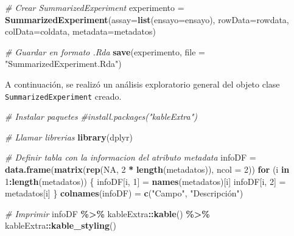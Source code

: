 \documentclass[
]{article}
\newenvironment{Shaded}{\begin{snugshade}}{\end{snugshade}}
\newcommand{\AttributeTok}[1]{\textcolor[rgb]{0.13,0.29,0.53}{#1}}
\newcommand{\CommentTok}[1]{\textcolor[rgb]{0.56,0.35,0.01}{\textit{#1}}}
\newcommand{\ConstantTok}[1]{\textcolor[rgb]{0.56,0.35,0.01}{#1}}
\newcommand{\ControlFlowTok}[1]{\textcolor[rgb]{0.13,0.29,0.53}{\textbf{#1}}}
\newcommand{\DecValTok}[1]{\textcolor[rgb]{0.00,0.00,0.81}{#1}}
\newcommand{\FunctionTok}[1]{\textcolor[rgb]{0.13,0.29,0.53}{\textbf{#1}}}
\newcommand{\NormalTok}[1]{#1}
\newcommand{\OtherTok}[1]{\textcolor[rgb]{0.56,0.35,0.01}{#1}}
\newcommand{\SpecialCharTok}[1]{\textcolor[rgb]{0.81,0.36,0.00}{\textbf{#1}}}
\newcommand{\StringTok}[1]{\textcolor[rgb]{0.31,0.60,0.02}{#1}}
\begin{document}
\begin{Shaded}
\begin{Highlighting}[]
\CommentTok{\# Crear SummarizedExperiment}
\NormalTok{experimento }\OtherTok{=} \FunctionTok{SummarizedExperiment}\NormalTok{(}\AttributeTok{assay=}\FunctionTok{list}\NormalTok{(}\AttributeTok{ensayo=}\NormalTok{ensayo), }\AttributeTok{rowData=}\NormalTok{rowdata, }\AttributeTok{colData=}\NormalTok{coldata, }\AttributeTok{metadata=}\NormalTok{metadatos)}

\CommentTok{\# Guardar en formato .Rda}
\FunctionTok{save}\NormalTok{(experimento, }\AttributeTok{file =} \StringTok{"SummarizedExperiment.Rda"}\NormalTok{)}
\end{Highlighting}
\end{Shaded}

A continuación, se realizó un análisis exploratorio general del objeto
clase \texttt{SummarizedExperiment} creado.

\begin{Shaded}
\begin{Highlighting}[]
\CommentTok{\# Instalar paquetes}
\CommentTok{\#install.packages("kableExtra")}

\CommentTok{\# Llamar librerias}
\FunctionTok{library}\NormalTok{(dplyr)}

\CommentTok{\# Definir tabla con la informacion del atributo metadata}
\NormalTok{infoDF }\OtherTok{=} \FunctionTok{data.frame}\NormalTok{(}\FunctionTok{matrix}\NormalTok{(}\FunctionTok{rep}\NormalTok{(}\ConstantTok{NA}\NormalTok{, }\DecValTok{2} \SpecialCharTok{*} \FunctionTok{length}\NormalTok{(metadatos)), }\AttributeTok{ncol =} \DecValTok{2}\NormalTok{))}
\ControlFlowTok{for}\NormalTok{ (i }\ControlFlowTok{in} \DecValTok{1}\SpecialCharTok{:}\FunctionTok{length}\NormalTok{(metadatos)) \{}
\NormalTok{    infoDF[i, }\DecValTok{1}\NormalTok{] }\OtherTok{=} \FunctionTok{names}\NormalTok{(metadatos)[i]}
\NormalTok{    infoDF[i, }\DecValTok{2}\NormalTok{] }\OtherTok{=}\NormalTok{ metadatos[i]}
\NormalTok{\}}
\FunctionTok{colnames}\NormalTok{(infoDF) }\OtherTok{=} \FunctionTok{c}\NormalTok{(}\StringTok{"Campo"}\NormalTok{, }\StringTok{"Descripción"}\NormalTok{)}

\CommentTok{\# Imprimir}
\NormalTok{infoDF }\SpecialCharTok{\%\textgreater{}\%}
\NormalTok{    kableExtra}\SpecialCharTok{::}\FunctionTok{kable}\NormalTok{() }\SpecialCharTok{\%\textgreater{}\%}
\NormalTok{    kableExtra}\SpecialCharTok{::}\FunctionTok{kable\_styling}\NormalTok{()}
\end{Highlighting}
\end{Shaded}
\end{document}

